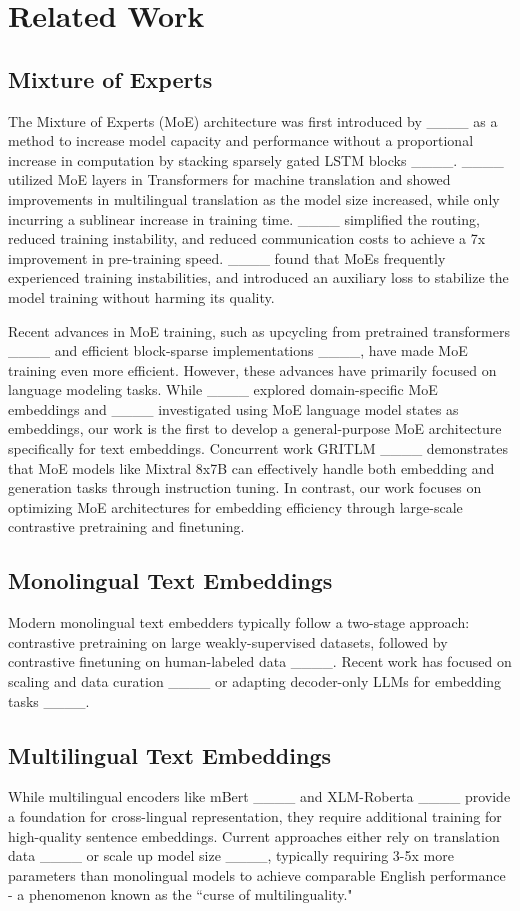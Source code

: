 \section{Related Work}
\subsection{Mixture of Experts}
The Mixture of Experts (MoE) architecture was first introduced by ____ as a method to increase model capacity and performance without a proportional increase in computation by stacking sparsely gated LSTM blocks ____.
____ utilized MoE layers in Transformers for machine translation and showed improvements in multilingual translation as the model size increased, while only incurring a sublinear increase in training time.
____ simplified the routing, reduced training instability, and reduced communication costs to achieve a 7x improvement in pre-training speed.
____ found that MoEs frequently experienced training instabilities, and introduced an auxiliary loss to stabilize the model training without harming its quality. 


Recent advances in MoE training, such as upcycling from pretrained transformers ____ and efficient block-sparse implementations ____, have made MoE training even more efficient. However, these advances have primarily focused on language modeling tasks. While ____ explored domain-specific MoE embeddings and ____ investigated using MoE language model states as embeddings, our work is the first to develop a general-purpose MoE architecture specifically for text embeddings. Concurrent work GRITLM ____ demonstrates that MoE models like Mixtral 8x7B can effectively handle both embedding and generation tasks through instruction tuning. In contrast, our work focuses on optimizing MoE architectures for embedding efficiency through large-scale contrastive pretraining and finetuning.


\subsection{Monolingual Text Embeddings}
Modern monolingual text embedders typically follow a two-stage approach: contrastive pretraining on large weakly-supervised datasets, followed by contrastive finetuning on human-labeled data ____.
Recent work has focused on scaling and data curation ____ or adapting decoder-only LLMs for embedding tasks ____.



\subsection{Multilingual Text Embeddings}
While multilingual encoders like mBert ____ and XLM-Roberta ____ provide a foundation for cross-lingual representation, they require additional training for high-quality sentence embeddings. Current approaches either rely on translation data ____ or scale up model size ____, typically requiring 3-5x more parameters than monolingual models to achieve comparable English performance - a phenomenon known as the ``curse of multilinguality."

